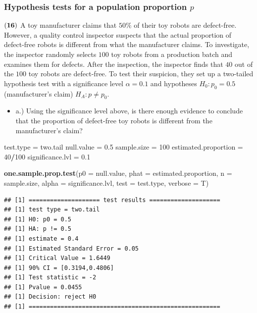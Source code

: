 \documentclass[
]{article}
\newenvironment{Shaded}{\begin{snugshade}}{\end{snugshade}}
\newcommand{\AttributeTok}[1]{\textcolor[rgb]{0.13,0.29,0.53}{#1}}
\newcommand{\DecValTok}[1]{\textcolor[rgb]{0.00,0.00,0.81}{#1}}
\newcommand{\FloatTok}[1]{\textcolor[rgb]{0.00,0.00,0.81}{#1}}
\newcommand{\FunctionTok}[1]{\textcolor[rgb]{0.13,0.29,0.53}{\textbf{#1}}}
\newcommand{\NormalTok}[1]{#1}
\newcommand{\OtherTok}[1]{\textcolor[rgb]{0.56,0.35,0.01}{#1}}
\newcommand{\SpecialCharTok}[1]{\textcolor[rgb]{0.81,0.36,0.00}{\textbf{#1}}}
\newcommand{\StringTok}[1]{\textcolor[rgb]{0.31,0.60,0.02}{#1}}
\providecommand{\tightlist}{%
  \setlength{\itemsep}{0pt}\setlength{\parskip}{0pt}}
\begin{document}
\subsubsection{\texorpdfstring{Hypothesis tests for a population
proportion
\(p\)}{Hypothesis tests for a population proportion p}}\label{hypothesis-tests-for-a-population-proportion-p}

\(\bf (16)\) A toy manufacturer claims that \(50\%\) of their toy robots
are defect-free. However, a quality control inspector suspects that the
actual proportion of defect-free robots is different from what the
manufacturer claims. To investigate, the inspector randomly selects
\(100\) toy robots from a production batch and examines them for
defects. After the inspection, the inspector finds that \(40\) out of
the \(100\) toy robots are defect-free. To test their suspicion, they
set up a two-tailed hypothesis test with a significance level
\(\alpha = 0.1\) and hypotheses \(H_0: p_0 = 0.5\) (manufacturer's
claim) \(H_A: p \neq p_0\).

\begin{itemize}
\tightlist
\item
  a.) Using the significance level above, is there enough evidence to
  conclude that the proportion of defect-free toy robots is different
  from the manufacturer's claim?
\end{itemize}

\begin{Shaded}
\begin{Highlighting}[]
\NormalTok{test.type }\OtherTok{=} \StringTok{\textquotesingle{}two.tail\textquotesingle{}}
\NormalTok{null.value }\OtherTok{=} \FloatTok{0.5}
\NormalTok{sample.size }\OtherTok{=} \DecValTok{100}
\NormalTok{estimated.proportion }\OtherTok{=} \DecValTok{40}\SpecialCharTok{/}\DecValTok{100}
\NormalTok{significance.lvl }\OtherTok{=} \FloatTok{0.1}

\FunctionTok{one.sample.prop.test}\NormalTok{(}\AttributeTok{p0 =}\NormalTok{ null.value,}
                     \AttributeTok{phat =}\NormalTok{ estimated.proportion,}
                     \AttributeTok{n =}\NormalTok{ sample.size,}
                     \AttributeTok{alpha =}\NormalTok{ significance.lvl,}
                     \AttributeTok{test =}\NormalTok{ test.type,}
                     \AttributeTok{verbose =}\NormalTok{ T)}
\end{Highlighting}
\end{Shaded}

\begin{verbatim}
## [1] ==================== test results ====================
## [1] test type = two.tail
## [1] H0: p0 = 0.5
## [1] HA: p != 0.5
## [1] estimate = 0.4
## [1] Estimated Standard Error = 0.05
## [1] Critical Value = 1.6449
## [1] 90% CI = [0.3194,0.4806]
## [1] Test statistic = -2
## [1] Pvalue = 0.0455
## [1] Decision: reject H0
## [1] ======================================================
\end{verbatim}
\end{document}
